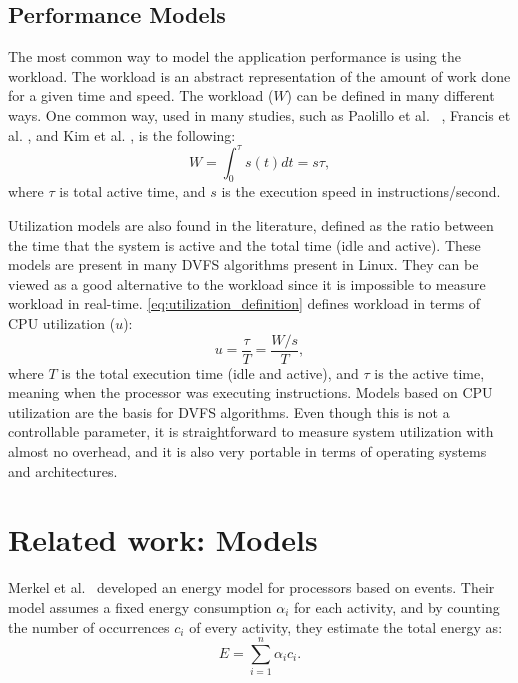 \subsection{Performance Models} \label{subsec:tb_performance_models}
The most common way to model the application performance is using the workload. The workload is an abstract representation of the amount of work done for a given time and speed. The workload ($W$) can be defined in many different ways. One common way, used in many studies, such as Paolillo et al. ~\cite{Paolillo2018OptimisationParallelism}, Francis et al. \cite{ Group2012HandbookSahni}, and Kim et al. \cite{Kim2015RacingHeuristics}, is the following:
\begin{equation}
W = \int_{0}^{\tau}s(t)dt = s\tau,
\label{eq:workload_definition}
\end{equation}
where $\tau$ is total active time, and $s$ is the execution speed in instructions/second.

Utilization models \cite{Fu2018RaceMinimization, Group2012HandbookSahni} are also found in the literature, defined as the ratio between the time that the system is active and the total time (idle and active). These models are present in many DVFS algorithms present in Linux. They can be viewed as a good alternative to the workload since it is impossible to measure workload in real-time.  \cref{eq:utilization_definition} defines workload in terms of CPU utilization ($u$):
\begin{equation}
u = \frac{\tau}{T} = \frac{W/s}{T},
\label{eq:utilization_definition}
\end{equation}
where $T$ is the total execution time (idle and active), and $\tau$ is the active time, meaning when the processor was executing instructions.
Models based on CPU utilization are the basis for DVFS algorithms. Even though this is not a controllable parameter, it is straightforward to measure system utilization with almost no overhead, and it is also very portable in terms of operating systems and architectures.

\section{Related work: Models} \label{sec:related_work_models}

Merkel et al.~\cite{Merkel2006BalancingSystems} developed an energy model for processors based on events. Their model assumes a fixed energy consumption $\alpha_i$ for each activity, and by counting the number of occurrences $c_i$ of every activity, they estimate the total energy as:
\begin{equation}
E = \sum_{i=1}^{n}\alpha_ic_i.
\label{equation:rw_merkel}
\end{equation}

